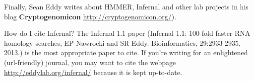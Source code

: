 Finally, Sean Eddy writes about HMMER, Infernal and other lab projects in
his blog \textbf{Cryptogenomicon} \url{http://cryptogenomicon.org/}).

\begin{srefaq}{How do I cite Infernal?}
The Infernal 1.1 paper (Infernal 1.1: 100-fold faster RNA homology
searches, EP Nawrocki and SR Eddy. Bioinformatics, 29:2933-2935,
2013.) is the most appropriate paper to cite. If you’re writing for an
enlightened (url-friendly) journal, you may want to cite the webpage
\url{http://eddylab.org/infernal/} because it is kept up-to-date.
\end{srefaq}












  









